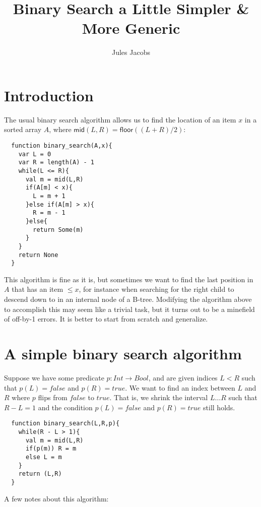 \documentclass[a4paper, 11pt]{article}
\title{Binary Search a Little Simpler \& More Generic}
\author{Jules Jacobs}
\begin{document}
\maketitle

\section{Introduction}

The usual binary search algorithm allows us to find the location of an item $x$ in a sorted array $A$, where $\mathsf{mid}(L,R) = \mathsf{floor}((L+R)/2)$:

\begin{lstlisting}
  function binary_search(A,x){
    var L = 0
    var R = length(A) - 1
    while(L <= R){
      val m = mid(L,R)
      if(A[m] < x){
        L = m + 1
      }else if(A[m] > x){
        R = m - 1
      }else{
        return Some(m)
      }
    }
    return None
  }
\end{lstlisting}

This algorithm is fine as it is, but sometimes we want to find the last position in $A$ that has an item $\leq x$, for instance when searching for the right child to descend down to in an internal node of a B-tree. Modifying the algorithm above to accomplish this may seem like a trivial task, but it turns out to be a minefield of off-by-1 errors. It is better to start from scratch and generalize.

\section{A simple binary search algorithm}

Suppose we have some predicate $p : Int \to Bool$, and are given indices $L < R$ such that $p(L) = false$ and $p(R) = true$. We want to find an index between $L$ and $R$ where $p$ flips from $false$ to $true$. That is, we shrink the interval $L\dots R$ such that $R - L = 1$ and the condition $p(L) = false$ and $p(R) = true$ still holds.

\begin{lstlisting}
  function binary_search(L,R,p){
    while(R - L > 1){
      val m = mid(L,R)
      if(p(m)) R = m
      else L = m
    }
    return (L,R)
  }
\end{lstlisting}

\noindent A few notes about this algorithm:
\end{document}
